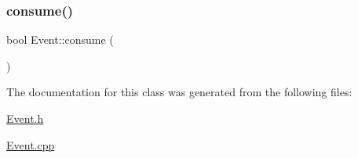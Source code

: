\subsubsection{\texorpdfstring{consume()}{consume()}}
{\footnotesize\ttfamily bool Event\+::consume (\begin{DoxyParamCaption}{ }\end{DoxyParamCaption})}



The documentation for this class was generated from the following files\+:\begin{DoxyCompactItemize}
\item 
\hyperlink{_event_8h}{Event.\+h}\item 
\hyperlink{_event_8cpp}{Event.\+cpp}\end{DoxyCompactItemize}
